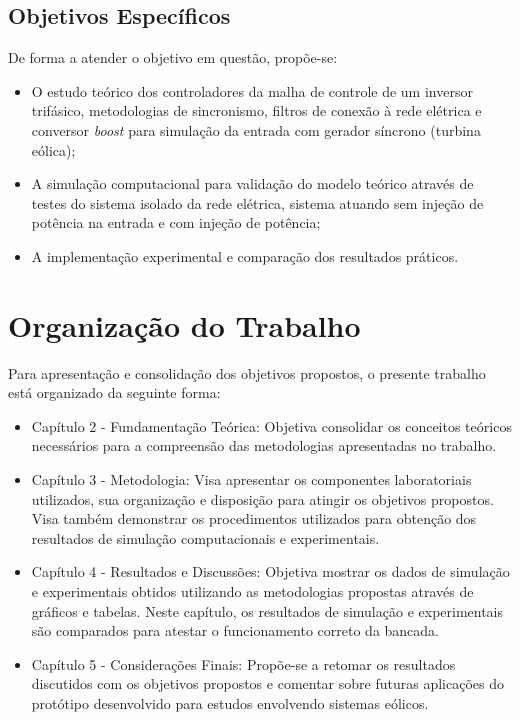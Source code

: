 \subsection{Objetivos Específicos}
De forma a atender o objetivo em questão, propõe-se:
\begin{itemize}
	\item O estudo teórico dos controladores da malha de controle de um inversor trifásico, metodologias de sincronismo, filtros de conexão à rede elétrica e conversor \textit{boost} para simulação da entrada com gerador síncrono (turbina eólica);
	\item A simulação computacional para validação do modelo teórico através de testes do sistema isolado da rede elétrica, sistema atuando sem injeção de potência na entrada e com injeção de potência;
	\item A implementação experimental e comparação dos resultados práticos.
\end{itemize}

\section{Organização do Trabalho}

Para apresentação e consolidação dos objetivos propostos, o presente trabalho está organizado da seguinte forma:

\begin{itemize}
	\item Capítulo 2 - Fundamentação Teórica: Objetiva consolidar os conceitos teóricos necessários para a compreensão das metodologias apresentadas no trabalho.
	\item Capítulo 3 - Metodologia: Visa apresentar os componentes laboratoriais utilizados, sua organização e disposição para atingir os objetivos propostos. Visa também demonstrar os procedimentos utilizados para obtenção dos resultados de simulação computacionais e experimentais.
	\item Capítulo 4 - Resultados e Discussões: Objetiva mostrar os dados de simulação e experimentais obtidos utilizando as metodologias propostas através de gráficos e tabelas. Neste capítulo, os resultados de simulação e experimentais são comparados para atestar o funcionamento correto da bancada.
	\item Capítulo 5 - Considerações Finais: Propõe-se a retomar os resultados discutidos com os objetivos propostos e comentar sobre futuras aplicações do protótipo desenvolvido para estudos envolvendo sistemas eólicos.
\end{itemize}